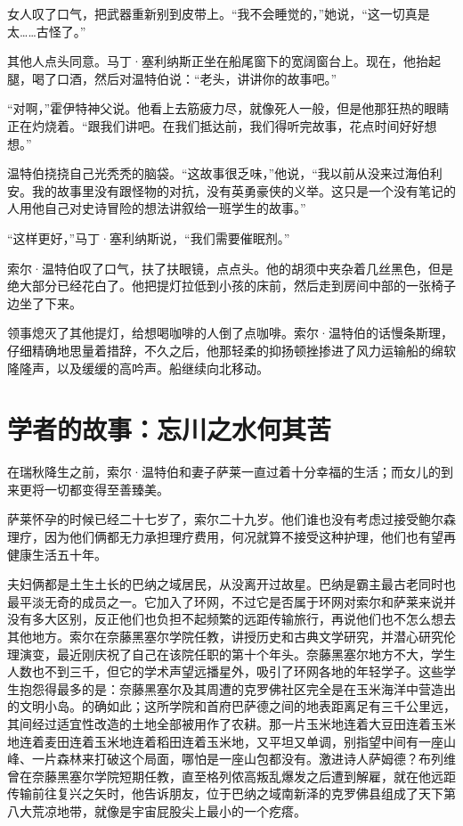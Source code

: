 \documentclass[AutoFakeBold=true]{book}
\begin{document}
女人叹了口气，把武器重新别到皮带上。``我不会睡觉的，''她说，``这一切真是太……古怪了。''

其他人点头同意。马丁·塞利纳斯正坐在船尾窗下的宽阔窗台上。现在，他抬起腿，喝了口酒，然后对温特伯说：``老头，讲讲你的故事吧。''

``对啊，''霍伊特神父说。他看上去筋疲力尽，就像死人一般，但是他那狂热的眼睛正在灼烧着。``跟我们讲吧。在我们抵达前，我们得听完故事，花点时间好好想想。''

温特伯挠挠自己光秃秃的脑袋。``这故事很乏味，''他说，``我以前从没来过海伯利安。我的故事里没有跟怪物的对抗，没有英勇豪侠的义举。这只是一个没有笔记的人用他自己对史诗冒险的想法讲叙给一班学生的故事。''

``这样更好，''马丁·塞利纳斯说，``我们需要催眠剂。''

索尔·温特伯叹了口气，扶了扶眼镜，点点头。他的胡须中夹杂着几丝黑色，但是绝大部分已经花白了。他把提灯拉低到小孩的床前，然后走到房间中部的一张椅子边坐了下来。

领事熄灭了其他提灯，给想喝咖啡的人倒了点咖啡。索尔·温特伯的话慢条斯理，仔细精确地思量着措辞，不久之后，他那轻柔的抑扬顿挫掺进了风力运输船的绵软隆隆声，以及缓缓的高吟声。船继续向北移动。

\section{学者的故事：忘川之水何其苦}

在瑞秋降生之前，索尔·温特伯和妻子萨莱一直过着十分幸福的生活；而女儿的到来更将一切都变得至善臻美。

萨莱怀孕的时候已经二十七岁了，索尔二十九岁。他们谁也没有考虑过接受鲍尔森理疗，因为他们俩都无力承担理疗费用，何况就算不接受这种护理，他们也有望再健康生活五十年。

夫妇俩都是土生土长的巴纳之域居民，从没离开过故星。巴纳是霸主最古老同时也最平淡无奇的成员之一。它加入了环网，不过它是否属于环网对索尔和萨莱来说并没有多大区别，反正他们也负担不起频繁的远距传输旅行，再说他们也不怎么想去其他地方。索尔在奈藤黑塞尔学院任教，讲授历史和古典文学研究，并潜心研究伦理演变，最近刚庆祝了自己在该院任职的第十个年头。奈藤黑塞尔地方不大，学生人数也不到三千，但它的学术声望远播星外，吸引了环网各地的年轻学子。这些学生抱怨得最多的是：奈藤黑塞尔及其周遭的克罗佛社区完全是在玉米海洋中营造出的文明小岛。的确如此；这所学院和首府巴萨德之间的地表距离足有三千公里远，其间经过适宜性改造的土地全部被用作了农耕。那一片玉米地连着大豆田连着玉米地连着麦田连着玉米地连着稻田连着玉米地，又平坦又单调，别指望中间有一座山峰、一片森林来打破这个局面，哪怕是一座山包都没有。激进诗人萨姆德？布列维曾在奈藤黑塞尔学院短期任教，直至格列侬高叛乱爆发之后遭到解雇，就在他远距传输前往复兴之矢时，他告诉朋友，位于巴纳之域南新泽的克罗佛县组成了天下第八大荒凉地带，就像是宇宙屁股尖上最小的一个疙瘩。
\end{document}
